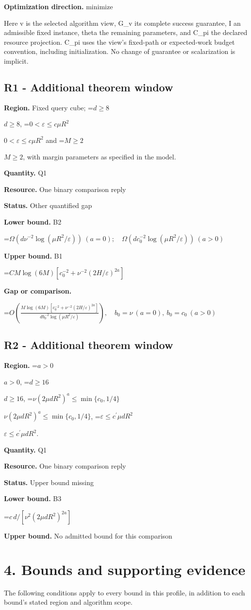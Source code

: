 \documentclass[10pt,a4paper]{article}
\newcommand{\AtlasMath}[1]{\par\begingroup\centering\setbox0=\hbox{$\displaystyle #1$}\ifdim\wd0>1.4\linewidth\typeout{ATLAS WIDE FORMULA: \the\wd0}\fi\ifdim\wd0>\linewidth\resizebox{\linewidth}{!}{\box0}\else\box0\fi\par\endgroup}
\newcommand{\AtlasInlineMath}[1]{\begingroup\setbox0=\hbox{$#1$}\ifdim\wd0>.4\linewidth\endgroup\AtlasMath{#1}\else\endgroup$#1$\fi}
\begin{document}
\textbf{Optimization direction.} minimize

Here v is the selected algorithm view, G\_v its complete success guarantee, I an admissible fixed instance, theta the remaining parameters, and C\_pi the declared resource projection. C\_pi uses the view's fixed-path or expected-work budget convention, including initialization. No change of guarantee or scalarization is implicit.

\subsection{R1 - Additional theorem window}
\textbf{Region.} Fixed query cube; \AtlasInlineMath{d\ge8}, \AtlasInlineMath{0<\varepsilon\le c\mu R^2} and \AtlasInlineMath{M\ge2}, with margin parameters as specified in the model.

\textbf{Quantity.} Q1

\textbf{Resource.} One binary comparison reply

\textbf{Status.} Other quantified gap

\textbf{Lower bound.} B2

\AtlasMath{\Omega(d\nu^{-2}\log(\mu R^2/\varepsilon))\ (a=0);\quad\Omega(dc_0^{-2}\log(\mu R^2/\varepsilon))\ (a>0)}
\textbf{Upper bound.} B1

\AtlasMath{CM\log(6M)[c_0^{-2}+\nu^{-2}(2H/\varepsilon)^{2a}]}
\textbf{Gap or comparison.} 
\AtlasMath{O\!\left(\frac{M\log(6M)[c_0^{-2}+\nu^{-2}(2H/\varepsilon)^{2a}]}{d b_0^{-2}\log(\mu R^2/\varepsilon)}\right),\quad b_0=\nu\ (a=0),\ b_0=c_0\ (a>0)}


\subsection{R2 - Additional theorem window}
\textbf{Region.} \AtlasInlineMath{a>0}, \AtlasInlineMath{d\ge16}, \AtlasInlineMath{\nu(2\mu dR^2)^a\le\min\{c_0,1/4\}}, \AtlasInlineMath{\varepsilon\le c^{\prime}\mu dR^2}.

\textbf{Quantity.} Q1

\textbf{Resource.} One binary comparison reply

\textbf{Status.} Upper bound missing

\textbf{Lower bound.} B3

\AtlasMath{c\,d/[\nu^2(2\mu dR^2)^{2a}]}
\textbf{Upper bound.} No admitted bound for this comparison

\section{4. Bounds and supporting evidence}
The following conditions apply to every bound in this profile, in addition to each bound's stated region and algorithm scope.
\end{document}
